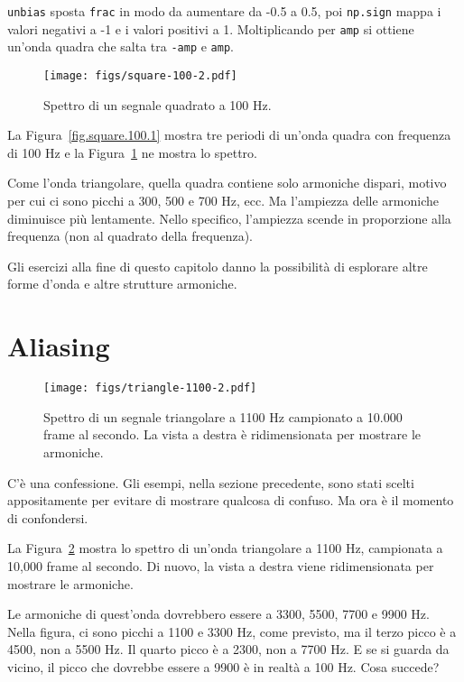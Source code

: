 \documentclass[12pt,a4paper]{book}
\begin{document}
{\tt unbias} sposta {\tt frac} in modo da aumentare da -0.5 a 0.5, poi {\tt np.sign} mappa i valori negativi a -1 e i valori positivi a 1. Moltiplicando per {\tt amp} si ottiene un'onda quadra che salta tra {\tt -amp} e {\tt amp}.

\begin{figure} 

\centerline{\texttt{[image: figs/square-100-2.pdf]}} \caption{Spettro di un segnale quadrato a 100 Hz.} \label{fig.square.100.2} \end{figure} 

La Figura~\ref{fig.square.100.1} mostra tre periodi di un'onda quadra con frequenza di 100 Hz e la Figura~\ref{fig.square.100.2} ne mostra lo spettro.

Come l'onda triangolare, quella quadra contiene solo armoniche dispari, motivo per cui ci sono picchi a 300, 500 e 700 Hz, ecc. Ma l'ampiezza delle armoniche diminuisce più lentamente. Nello specifico, l'ampiezza scende in proporzione alla frequenza (non al quadrato della frequenza).

Gli esercizi alla fine di questo capitolo danno la possibilità di esplorare altre forme d'onda e altre strutture armoniche.

\section{Aliasing} \label{aliasing} 

\begin{figure} 

\centerline{\texttt{[image: figs/triangle-1100-2.pdf]}} \caption{Spettro di un segnale triangolare a 1100 Hz campionato a 10.000 frame al secondo. La vista a destra è ridimensionata per mostrare le armoniche.} \label{fig.triangle.1100.2} \end{figure} 

C'è una confessione. Gli esempi, nella sezione precedente, sono stati scelti appositamente per evitare di mostrare qualcosa di confuso. Ma ora è il momento di confondersi.

La Figura~\ref{fig.triangle.1100.2} mostra lo spettro di un'onda triangolare a 1100 Hz, campionata a 10,000 frame al secondo. Di nuovo, la vista a destra viene ridimensionata per mostrare le armoniche.

Le armoniche di quest'onda dovrebbero essere a 3300, 5500, 7700 e 9900 Hz. Nella figura, ci sono picchi a 1100 e 3300 Hz, come previsto, ma il terzo picco è a 4500, non a 5500 Hz. Il quarto picco è a 2300, non a 7700 Hz. E se si guarda da vicino, il picco che dovrebbe essere a 9900 è in realtà a 100 Hz. Cosa succede?
\end{document}
